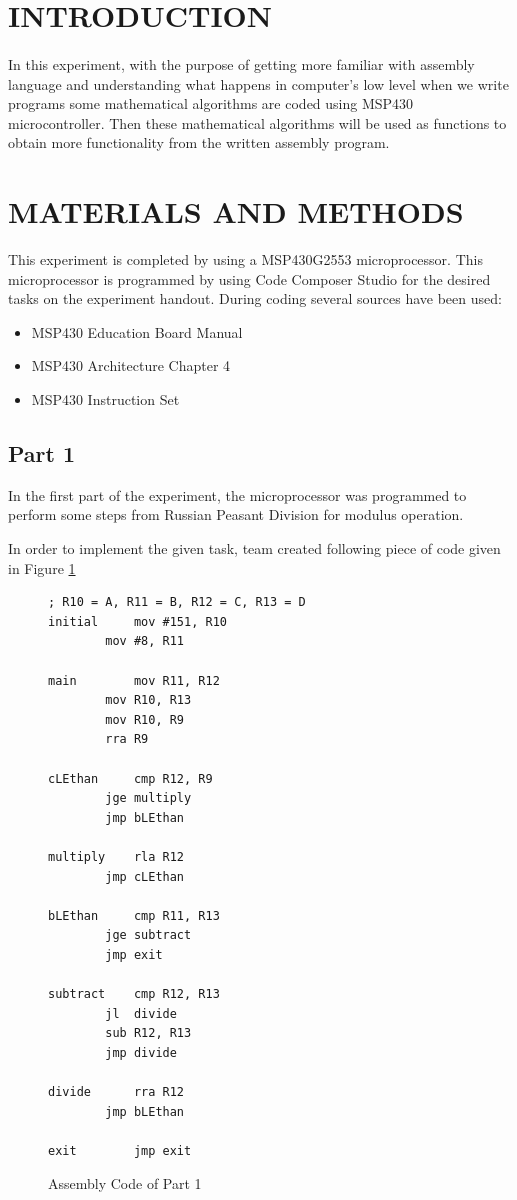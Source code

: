 \documentclass[pdftex,12pt,a4paper]{article}
\begin{document}
\section{INTRODUCTION}
\paragraph{}
In this experiment, with the purpose of getting more familiar with assembly language and understanding what happens in computer's low level when we write programs some mathematical algorithms are coded using MSP430 microcontroller. Then these mathematical algorithms will be used as functions to obtain more functionality from the written assembly program.

\section{MATERIALS AND METHODS}

This experiment is completed by using a MSP430G2553 microprocessor. This microprocessor is programmed by using Code Composer Studio for the desired tasks on the experiment handout. During coding several sources have been used:

\begin{itemize}
    \item MSP430 Education Board Manual \cite{ref2}
    \item MSP430 Architecture Chapter 4 \cite{ref3}
    \item MSP430 Instruction Set \cite{ref4}
\end{itemize}

\subsection{Part 1}
In the first part of the experiment, the microprocessor was programmed to perform some steps from Russian Peasant Division for modulus operation.

\newline
In order to implement the given task, team created following piece of code given in Figure \ref{code:part1}

\begin{figure}[H]
    \centering
    \begin{lstlisting}[language={[x86masm]Assembler}]
; R10 = A, R11 = B, R12 = C, R13 = D
initial		mov	#151, R10
		mov	#8, R11

main		mov	R11, R12
		mov	R10, R13
		mov	R10, R9
		rra	R9

cLEthan		cmp	R12, R9
		jge	multiply
		jmp	bLEthan

multiply	rla	R12
		jmp	cLEthan

bLEthan		cmp	R11, R13
		jge	subtract
		jmp	exit

subtract	cmp	R12, R13
		jl	divide
		sub	R12, R13
		jmp	divide

divide		rra	R12
		jmp	bLEthan

exit		jmp	exit
    \end{lstlisting}
    \label{code:part1}
    \caption{Assembly Code of Part 1}
\end{figure}
\end{document}
